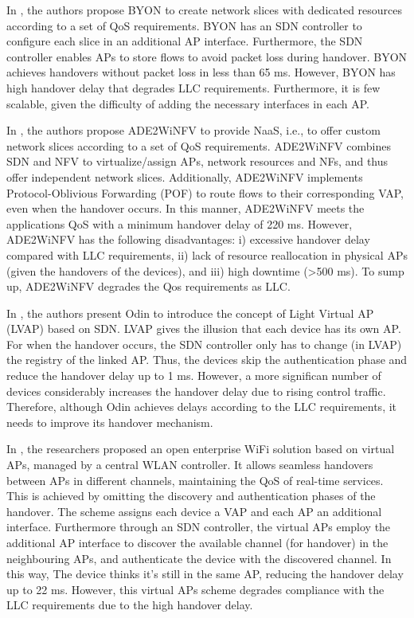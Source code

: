 In \cite{101}, the authors propose BYON to create network slices with dedicated resources according to a set of QoS requirements. BYON has an SDN controller to configure each slice in an additional AP interface. Furthermore, the SDN controller enables APs to store flows to avoid packet loss during handover. BYON achieves handovers without packet loss in less than 65 ms. However, BYON has high handover delay that degrades LLC requirements. Furthermore, it is few scalable, given the difficulty of adding the necessary interfaces in each AP.

In \cite{209}, the authors propose ADE2WiNFV to provide NaaS, i.e., to offer custom network slices according to a set of QoS requirements. ADE2WiNFV combines SDN and NFV to virtualize/assign APs, network resources and NFs, and thus offer independent network slices. Additionally, ADE2WiNFV implements Protocol-Oblivious Forwarding (POF) to route flows to their corresponding VAP, even when the handover occurs. In this manner, ADE2WiNFV meets the applications QoS with a minimum handover delay of 220 ms. However, ADE2WiNFV has the following disadvantages: i) excessive handover delay compared with LLC requirements, ii) lack of resource reallocation in physical APs (given the handovers of the devices), and iii) high downtime (\textgreater 500 ms). To sump up, ADE2WiNFV degrades the Qos requirements as LLC.

In \cite{26}, the authors present Odin to introduce the concept of Light Virtual AP (LVAP) based on SDN. LVAP gives the illusion that each device has its own AP. For when the handover occurs, the SDN controller only has to change (in LVAP) the registry of the linked AP. Thus, the devices skip the authentication phase and reduce the handover delay up to 1 ms. However, a more significan number of devices considerably increases the handover delay due to rising control traffic. Therefore, although Odin achieves delays according to the LLC requirements, it needs to improve its handover mechanism.

In \cite{103}, the researchers proposed an open enterprise WiFi solution based on virtual APs, managed by a central WLAN controller. It allows seamless handovers between APs in different channels, maintaining the QoS of real-time services. This is achieved by omitting the discovery and authentication phases of the handover. The scheme assigns each device a VAP and each AP an additional interface. Furthermore through an SDN controller, the virtual APs employ the additional AP interface to discover the available channel (for handover) in the neighbouring APs, and authenticate the device with the discovered channel. In this way, The device thinks it's still in the same AP, reducing the handover delay up to 22 ms. However, this virtual APs scheme degrades compliance with the LLC requirements due to the high handover delay.\\

